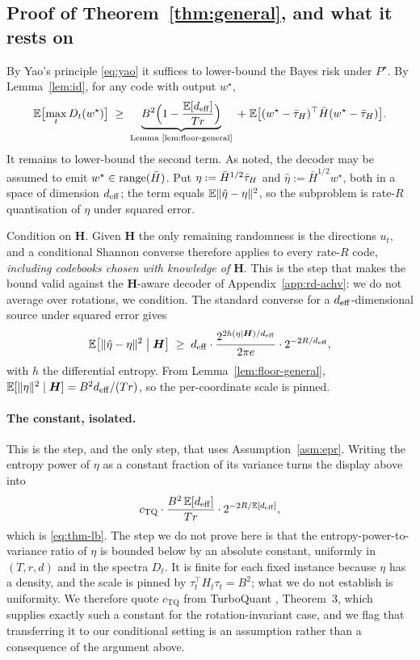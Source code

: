\subsection{Proof of Theorem~\ref{thm:general}, and what it rests on}

By Yao's principle \eqref{eq:yao} it suffices to lower-bound the Bayes risk
under $P^\star$. By Lemma~\ref{lem:id}, for any code with output $w^\star$,
\begin{equation*}
  \mathbb{E}\bigl[\max_t D_t(w^\star)\bigr]
  \;\geq\;
  \underbrace{B^2\Bigl(1 - \frac{\mathbb{E}[d_{\mathrm{eff}}]}{Tr}\Bigr)}_{\text{Lemma
  \ref{lem:floor-general}}}
  \;+\;
  \mathbb{E}\bigl[(w^\star-\bar{\tau}_H)^\top \bar H (w^\star-\bar{\tau}_H)\bigr].
\end{equation*}
It remains to lower-bound the second term. As noted, the decoder may be
assumed to emit $w^\star \in \operatorname{range}(\bar H)$. Put
$\eta := \bar H^{1/2}\bar{\tau}_H$ and $\hat\eta := \bar H^{1/2} w^\star$, both in a
space of dimension $d_{\mathrm{eff}}$; the term equals $\mathbb{E}\|\hat\eta - \eta\|^2$, so the
subproblem is rate-$R$ quantisation of $\eta$ under squared error.

Condition on $\boldsymbol H$. Given $\boldsymbol H$ the only remaining
randomness is the directions $u_t$, and a conditional Shannon converse
therefore applies to every rate-$R$ code, \emph{including codebooks chosen
with knowledge of $\boldsymbol H$}. This is the step that makes the bound valid
against the $\boldsymbol H$-aware decoder of Appendix~\ref{app:rd-achv}: we do not
average over rotations, we condition. The standard converse for a
$d_{\mathrm{eff}}$-dimensional source under squared error gives
\begin{equation*}
  \mathbb{E}\bigl[\|\hat\eta - \eta\|^2 \bigm| \boldsymbol H\bigr]
  \;\geq\; d_{\mathrm{eff}} \cdot \frac{2^{2h(\eta \mid \boldsymbol H)/d_{\mathrm{eff}}}}
  {2\pi e}\cdot 2^{-2R/d_{\mathrm{eff}}},
\end{equation*}
with $h$ the differential entropy. From Lemma~\ref{lem:floor-general},
$\mathbb{E}[\|\eta\|^2 \mid \boldsymbol H] = B^2d_{\mathrm{eff}}/(Tr)$, so the per-coordinate
scale is pinned.

\paragraph{The constant, isolated.} This is the step, and the only step, that
uses Assumption~\ref{asm:epr}. Writing the entropy power of $\eta$ as a
constant fraction of its variance turns the display above into
\begin{equation*}
  c_{\mathrm{TQ}}\cdot \frac{B^2\,\mathbb{E}[d_{\mathrm{eff}}]}{Tr}\cdot 2^{-2R/\mathbb{E}[d_{\mathrm{eff}}]},
\end{equation*}
which is \eqref{eq:thm-lb}. The step we do not prove here is that the
entropy-power-to-variance ratio of $\eta$ is bounded below by an absolute
constant, uniformly in $(T, r, d)$ and in the spectra $D_t$. It is finite for
each fixed instance because $\eta$ has a density, and the scale is pinned by
$\tau_t^\top H_t\tau_t = B^2$; what we do not establish is uniformity. We
therefore quote $c_{\mathrm{TQ}}$ from TurboQuant
\citep{zandieh2025turboquant}, Theorem~3, which supplies exactly such a
constant for the rotation-invariant case, and we flag that transferring it to
our conditional setting is an assumption rather than a consequence of the
argument above.

